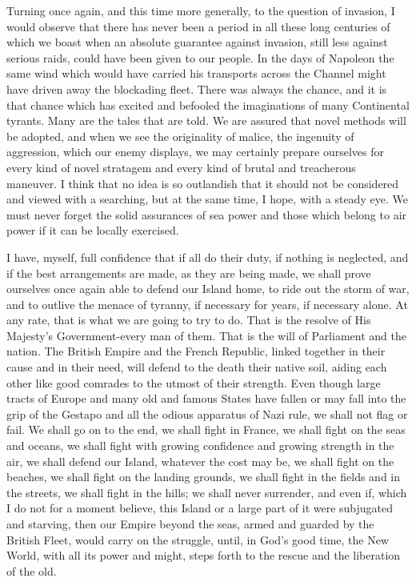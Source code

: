\documentclass[a4paper]{amsbook}
\begin{document}
Turning once again, and this time more generally, to the question of invasion, I would observe that there has never been a period in all these long centuries of which we boast when an absolute guarantee against invasion, still less against serious raids, could have been given to our people. In the days of Napoleon the same wind which would have carried his transports across the Channel might have driven away the blockading fleet. There was always the chance, and it is that chance which has excited and befooled the imaginations of many Continental tyrants. Many are the tales that are told. We are assured that novel methods will be adopted, and when we see the originality of malice, the ingenuity of aggression, which our enemy displays, we may certainly prepare ourselves for every kind of novel stratagem and every kind of brutal and treacherous maneuver. I think that no idea is so outlandish that it should not be considered and viewed with a searching, but at the same time, I hope, with a steady eye. We must never forget the solid assurances of sea power and those which belong to air power if it can be locally exercised.

I have, myself, full confidence that if all do their duty, if nothing is neglected, and if the best arrangements are made, as they are being made, we shall prove ourselves once again able to defend our Island home, to ride out the storm of war, and to outlive the menace of tyranny, if necessary for years, if necessary alone. At any rate, that is what we are going to try to do. That is the resolve of His Majesty's Government-every man of them. That is the will of Parliament and the nation. The British Empire and the French Republic, linked together in their cause and in their need, will defend to the death their native soil, aiding each other like good comrades to the utmost of their strength. Even though large tracts of Europe and many old and famous States have fallen or may fall into the grip of the Gestapo and all the odious apparatus of Nazi rule, we shall not flag or fail. We shall go on to the end, we shall fight in France, we shall fight on the seas and oceans, we shall fight with growing confidence and growing strength in the air, we shall defend our Island, whatever the cost may be, we shall fight on the beaches, we shall fight on the landing grounds, we shall fight in the fields and in the streets, we shall fight in the hills; we shall never surrender, and even if, which I do not for a moment believe, this Island or a large part of it were subjugated and starving, then our Empire beyond the seas, armed and guarded by the British Fleet, would carry on the struggle, until, in God's good time, the New World, with all its power and might, steps forth to the rescue and the liberation of the old.
\end{document}
